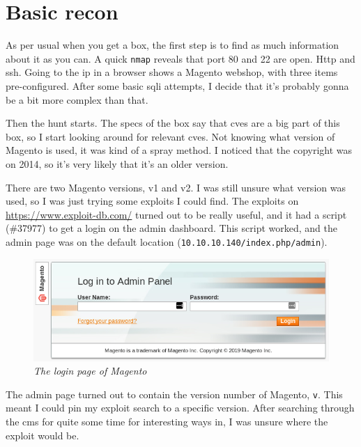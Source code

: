 \chapter{Basic recon}
\label{chap:basic_recon}

As per usual when you get a box, the first step is to find as much information about it as you can. A quick \verb|nmap| reveals that port 80 and 22 are open. Http and ssh. Going to the ip in a browser shows a Magento webshop, with three items pre-configured. After some basic \gls{sqli} attempts, I decide that it's probably gonna be a bit more complex than that.

Then the hunt starts. The specs of the box say that \glspl{cve} are a big part of this box, so I start looking around for relevant \glspl{cve}. Not knowing what version of Magento is used, it was kind of a spray method. I noticed that the copyright was on 2014, so it's very likely that it's an older version.

There are two Magento versions, v1 and v2. I was still unsure what version was used, so I was just trying some exploits I could find. The exploits on \url{https://www.exploit-db.com/} turned out to be really useful, and it had a script (\#37977) to get a login on the admin dashboard. This script worked, and the admin page was on the default location (\verb|10.10.10.140/index.php/admin|).

\begin{figure}[H]
	\centering
	\captionsetup{justification=centering}
	\noindent \includegraphics[width=\textwidth]{figures/magento-login.png}
	\caption{\emph{The login page of Magento}}
	\label{fig:magentologin}
\end{figure}

The admin page turned out to contain the version number of Magento, \verb|v|. This meant I could pin my exploit search to a specific version. After searching through the \gls{cms} for quite some time for interesting ways in, I was unsure where the exploit would be.

\vspace{5mm}

